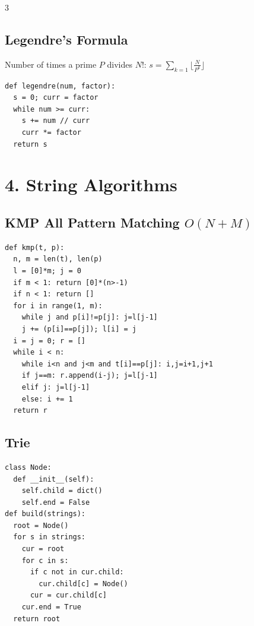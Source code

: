 \documentclass[8pt,a4paper,landscape]{extarticle}
\begin{document}
\begin{multicols*}{3}
\subsection*{Legendre's Formula}
Number of times a prime $P$ divides $N!$: $s = \sum_{k=1} \lfloor \frac{N}{P^k} \rfloor$
\begin{lstlisting}
def legendre(num, factor):
  s = 0; curr = factor
  while num >= curr:
    s += num // curr
    curr *= factor
  return s
\end{lstlisting}

\section*{4. String Algorithms}
\subsection*{KMP All Pattern Matching $O(N+M)$}
\begin{lstlisting}
def kmp(t, p):
  n, m = len(t), len(p)
  l = [0]*m; j = 0
  if m < 1: return [0]*(n>-1)
  if n < 1: return []
  for i in range(1, m):
    while j and p[i]!=p[j]: j=l[j-1]
    j += (p[i]==p[j]); l[i] = j
  i = j = 0; r = []
  while i < n:
    while i<n and j<m and t[i]==p[j]: i,j=i+1,j+1
    if j==m: r.append(i-j); j=l[j-1]
    elif j: j=l[j-1]
    else: i += 1
  return r
\end{lstlisting}

\subsection*{Trie}
\begin{lstlisting}
class Node:
  def __init__(self):
    self.child = dict()
    self.end = False
def build(strings):
  root = Node()
  for s in strings:
    cur = root
    for c in s:
      if c not in cur.child:
        cur.child[c] = Node()
      cur = cur.child[c]
    cur.end = True
  return root
\end{lstlisting}


\end{multicols*}
\end{document}
